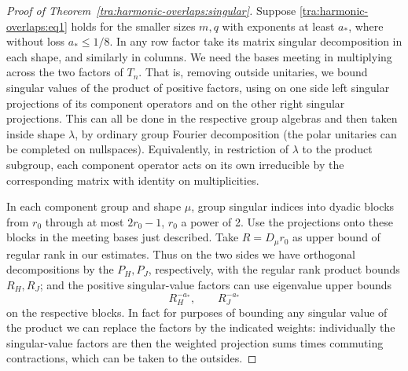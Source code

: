 \begin{proof}[Proof of Theorem~\ref{tra:harmonic-overlaps:singular}]
\label{tra:harmonic-overlaps:dyadic-analytic-family}
Suppose \eqref{tra:harmonic-overlaps:eq1} holds for the smaller sizes \(m,q\) with exponents at least \(a_*\), where without loss \(a_*\le 1/8\). In any row factor take its matrix singular decomposition in each shape, and similarly in columns. We need the bases meeting in multiplying across the two factors of \(T_n\). That is, removing outside unitaries, we bound singular values of the product of positive factors, using on one side left singular projections of its component operators and on the other right singular projections. This can all be done in the respective group algebras and then taken inside shape \(\lambda\), by ordinary group Fourier decomposition (the polar unitaries can be completed on nullspaces). Equivalently, in restriction of \(\lambda\) to the product subgroup, each component operator acts on its own irreducible by the corresponding matrix with identity on multiplicities.

In each component group and shape \(\mu\), group singular indices into dyadic blocks from \(r_0\) through at most \(2r_0-1\), \(r_0\) a power of 2. Use the projections onto these blocks in the meeting bases just described. Take \(R=D_\mu r_0\) as upper bound of regular rank in our estimates. Thus on the two sides we have orthogonal decompositions by the \(P_H,P_J\), respectively, with the regular rank product bounds \(R_H,R_J\); and the positive singular-value factors can use eigenvalue upper bounds
\begin{equation}
                                  R_H^{-a_*},\qquad R_J^{-a_*}             \label{tra:harmonic-overlaps:eq31}
\end{equation}
on the respective blocks. In fact for purposes of bounding any singular value of the product we can replace the factors by the indicated weights: individually the singular-value factors are then the weighted projection sums times commuting contractions, which can be taken to the outsides.


\end{proof}
